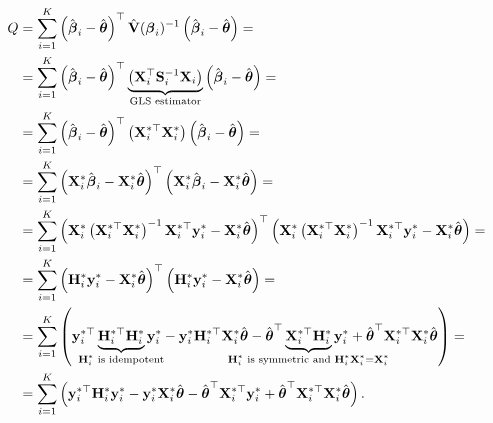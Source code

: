 \begin{align*}
Q &= \sum_{i=1}^K \left(\hat{\boldsymbol{\beta}}_i - \hat{\boldsymbol{\theta}} \right)^\top  \hat{\mathbf{V}}(\boldsymbol{\beta}_i)^{-1} \left(\hat{\boldsymbol{\beta}}_i - \hat{\boldsymbol{\theta}} \right) = \\
&= \sum_{i=1}^K \left(\hat{\boldsymbol{\beta}}_i - \hat{\boldsymbol{\theta}} \right)^\top \underbrace{\left(\mathbf{X}_i^{\top} \mathbf{S}_i^{-1} \mathbf{X}_i \right)}_{\textrm{GLS estimator}} \left(\hat{\boldsymbol{\beta}}_i - \hat{\boldsymbol{\theta}} \right) = \\
&= \sum_{i=1}^K \left(\hat{\boldsymbol{\beta}}_i - \hat{\boldsymbol{\theta}} \right)^\top \left(\mathbf{X}_i^{*\top} \mathbf{X}_i^* \right) \left(\hat{\boldsymbol{\beta}}_i - \hat{\boldsymbol{\theta}} \right) = \\
&= \sum_{i=1}^K \left( \mathbf{X}_i^* \hat{\boldsymbol{\beta}}_i - \mathbf{X}_i^* \hat{\boldsymbol{\theta}} \right)^\top \left( \mathbf{X}_i^* \hat{\boldsymbol{\beta}}_i - \mathbf{X}_i^* \hat{\boldsymbol{\theta}} \right) = \\
&= \sum_{i=1}^K \left( \mathbf{X}_i^* \left(\mathbf{X}_i^{*\top} \mathbf{X}_i^* \right)^{-1} \mathbf{X}_i^{*\top} \mathbf{y}_i^* - \mathbf{X}_i^* \hat{\boldsymbol{\theta}} \right)^\top \left( \mathbf{X}_i^* \left(\mathbf{X}_i^{*\top} \mathbf{X}_i^* \right)^{-1} \mathbf{X}_i^{*\top} \mathbf{y}_i^* - \mathbf{X}_i^* \hat{\boldsymbol{\theta}} \right) = \\
&=\sum_{i=1}^K \left( \mathbf{H}_i^* \mathbf{y}_i^* - \mathbf{X}_i^* \hat{\boldsymbol{\theta}} \right)^\top \left( \mathbf{H}_i^* \mathbf{y}_i^* - \mathbf{X}_i^* \hat{\boldsymbol{\theta}} \right) = \\
&=\sum_{i=1}^K \left( \mathbf{y}_i^{*\top} \underbrace{\mathbf{H}_i^{*\top} \mathbf{H}_i^{*}}_{\mathclap{\mathbf{H}_i^{*} \textrm{ is idempotent}}} \mathbf{y}_i^{*} - \mathbf{y}_i^{*} {\mathbf{H}_i^{*\top} \mathbf{X}_i^*} \hat{\boldsymbol{\theta}} - \hat{\boldsymbol{\theta}}^\top \underbrace{\mathbf{X}_i^{*\top} \mathbf{H}_i^{*}}_{\mathclap{\mathbf{H}_i^* \textrm{ is symmetric and } \mathbf{H}_i^* \mathbf{X}_i^* = \mathbf{X}_i^*}} \mathbf{y}_i^{*} + \hat{\boldsymbol{\theta}}^\top \mathbf{X}_i^{*\top} \mathbf{X}_i^* \hat{\boldsymbol{\theta}} \right) = \\
&=\sum_{i=1}^K \left( \mathbf{y}_i^{*\top}  \mathbf{H}_i^{*} \mathbf{y}_i^{*} - \mathbf{y}_i^{*} \mathbf{X}_i^* \hat{\boldsymbol{\theta}} - \hat{\boldsymbol{\theta}}^\top \mathbf{X}_i^{*\top} \mathbf{y}_i^{*} + \hat{\boldsymbol{\theta}}^\top \mathbf{X}_i^{*\top} \mathbf{X}_i^* \hat{\boldsymbol{\theta}} \right).
\end{align*}

